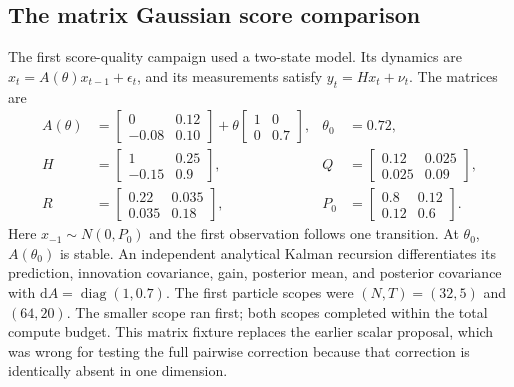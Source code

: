 \documentclass[11pt]{article}
\newcommand{\dd}{\mathrm{d}}
\begin{document}
\subsection{The matrix Gaussian score comparison}

The first score-quality campaign used a two-state model.  Its dynamics are
$x_t=A(\theta)x_{t-1}+\epsilon_t$, and its measurements satisfy
$y_t=Hx_t+\nu_t$.  The matrices are
\begin{align}
 A(\theta)
 &=
 \begin{bmatrix}0&0.12\\-0.08&0.10\end{bmatrix}
 +\theta\begin{bmatrix}1&0\\0&0.7\end{bmatrix},
 &\theta_0&=0.72,\\
 H&=\begin{bmatrix}1&0.25\\-0.15&0.9\end{bmatrix},
 &Q&=\begin{bmatrix}0.12&0.025\\0.025&0.09\end{bmatrix},\\
 R&=\begin{bmatrix}0.22&0.035\\0.035&0.18\end{bmatrix},
 &P_0&=\begin{bmatrix}0.8&0.12\\0.12&0.6\end{bmatrix}.
 \label{eq:phase4b-matrix-lgssm}
\end{align}
Here $x_{-1}\sim N(0,P_0)$ and the first observation follows one transition.
At $\theta_0$, $A(\theta_0)$ is stable.  An independent analytical Kalman
recursion differentiates its prediction, innovation covariance, gain, posterior
mean, and posterior covariance with $\dd A=\operatorname{diag}(1,0.7)$.  The
first particle scopes were $(N,T)=(32,5)$ and $(64,20)$.  The smaller scope ran
first; both scopes completed within the total compute budget.  This matrix
fixture replaces the earlier scalar proposal,
which was wrong for testing the full pairwise correction because that
correction is identically absent in one dimension.
\end{document}
